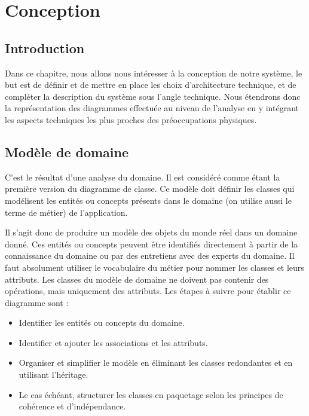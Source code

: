 \chapter{Conception}
\renewcommand{\headrulewidth}{1pt}

\section{Introduction}
Dans ce chapitre, nous allons nous intéresser à la conception de notre système, 
le but est de définir et de mettre en place les choix d’architecture technique, 
et de compléter la description du système sous l’angle technique. Nous 
étendrons donc la représentation des diagrammes effectuée au niveau de 
l’analyse en y intégrant les aspects techniques les plus proches des 
préoccupations physiques.

\section{Modèle de domaine}
C’est le résultat d’une analyse du domaine. Il est considéré comme étant la 
première version du diagramme de classe. Ce modèle doit définir les classes 
qui modélisent les entités ou concepts présents dans le domaine (on utilise 
aussi le terme de métier) de l’application.

Il s’agit donc de produire un modèle des objets du monde réel dans un domaine 
donné. Ces entités ou concepts peuvent être identifiés directement à partir de 
la connaissance du domaine ou par des entretiens avec des experts du domaine. 
Il faut absolument utiliser le vocabulaire du métier pour nommer les classes et 
leurs attributs. Les classes du modèle de domaine ne doivent pas contenir des 
opérations, mais uniquement des attributs\cite{7}. Les étapes à suivre pour 
établir ce diagramme sont :

\begin{itemize}
    \item [\textbullet] Identifier les entités ou concepts du domaine.
    \item [\textbullet] Identifier et ajouter les associations et les attributs.
    \item [\textbullet] Organiser et simplifier le modèle en éliminant les 
        classes redondantes et en utilisant l'héritage.
    \item [\textbullet] Le cas échéant, structurer les classes en paquetage 
        selon les principes de cohérence et d'indépendance.
\end{itemize}

